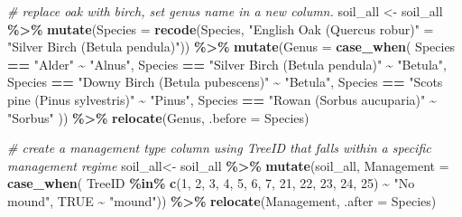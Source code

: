 \documentclass[
]{article}
\newenvironment{Shaded}{\begin{snugshade}}{\end{snugshade}}
\newcommand{\AttributeTok}[1]{\textcolor[rgb]{0.13,0.29,0.53}{#1}}
\newcommand{\CommentTok}[1]{\textcolor[rgb]{0.56,0.35,0.01}{\textit{#1}}}
\newcommand{\ConstantTok}[1]{\textcolor[rgb]{0.56,0.35,0.01}{#1}}
\newcommand{\DecValTok}[1]{\textcolor[rgb]{0.00,0.00,0.81}{#1}}
\newcommand{\FunctionTok}[1]{\textcolor[rgb]{0.13,0.29,0.53}{\textbf{#1}}}
\newcommand{\NormalTok}[1]{#1}
\newcommand{\OtherTok}[1]{\textcolor[rgb]{0.56,0.35,0.01}{#1}}
\newcommand{\SpecialCharTok}[1]{\textcolor[rgb]{0.81,0.36,0.00}{\textbf{#1}}}
\newcommand{\StringTok}[1]{\textcolor[rgb]{0.31,0.60,0.02}{#1}}
\begin{document}
\begin{Shaded}
\begin{Highlighting}[]
\CommentTok{\# replace oak with birch, set genus name in a new column. }
\NormalTok{soil\_all }\OtherTok{\textless{}{-}}\NormalTok{ soil\_all }\SpecialCharTok{\%\textgreater{}\%} 
  \FunctionTok{mutate}\NormalTok{(}\AttributeTok{Species =} \FunctionTok{recode}\NormalTok{(Species,}
                          \StringTok{"English Oak (Quercus robur)"} \OtherTok{=} \StringTok{"Silver Birch (Betula pendula)"}\NormalTok{)) }\SpecialCharTok{\%\textgreater{}\%}
  \FunctionTok{mutate}\NormalTok{(}\AttributeTok{Genus =} \FunctionTok{case\_when}\NormalTok{(}
\NormalTok{    Species }\SpecialCharTok{==} \StringTok{"Alder"} \SpecialCharTok{\textasciitilde{}} \StringTok{"Alnus"}\NormalTok{, }
\NormalTok{    Species }\SpecialCharTok{==} \StringTok{"Silver Birch (Betula pendula)"} \SpecialCharTok{\textasciitilde{}} \StringTok{"Betula"}\NormalTok{, }
\NormalTok{    Species }\SpecialCharTok{==} \StringTok{"Downy Birch (Betula pubescens)"} \SpecialCharTok{\textasciitilde{}} \StringTok{"Betula"}\NormalTok{,}
\NormalTok{    Species }\SpecialCharTok{==} \StringTok{"Scots pine (Pinus sylvestris)"} \SpecialCharTok{\textasciitilde{}} \StringTok{"Pinus"}\NormalTok{,}
\NormalTok{    Species }\SpecialCharTok{==} \StringTok{"Rowan (Sorbus aucuparia)"} \SpecialCharTok{\textasciitilde{}} \StringTok{"Sorbus"}
\NormalTok{  ))  }\SpecialCharTok{\%\textgreater{}\%}
  \FunctionTok{relocate}\NormalTok{(Genus, }\AttributeTok{.before =}\NormalTok{ Species)}

\CommentTok{\# create a management type column using TreeID that falls within a specific management regime}
\NormalTok{soil\_all}\OtherTok{\textless{}{-}}\NormalTok{ soil\_all }\SpecialCharTok{\%\textgreater{}\%} 
  \FunctionTok{mutate}\NormalTok{(soil\_all, }\AttributeTok{Management =} \FunctionTok{case\_when}\NormalTok{(}
\NormalTok{    TreeID }\SpecialCharTok{\%in\%} \FunctionTok{c}\NormalTok{(}\DecValTok{1}\NormalTok{, }\DecValTok{2}\NormalTok{, }\DecValTok{3}\NormalTok{, }\DecValTok{4}\NormalTok{, }\DecValTok{5}\NormalTok{, }\DecValTok{6}\NormalTok{, }\DecValTok{7}\NormalTok{, }\DecValTok{21}\NormalTok{, }\DecValTok{22}\NormalTok{, }\DecValTok{23}\NormalTok{, }\DecValTok{24}\NormalTok{, }\DecValTok{25}\NormalTok{) }\SpecialCharTok{\textasciitilde{}} \StringTok{"No mound"}\NormalTok{, }
    \ConstantTok{TRUE} \SpecialCharTok{\textasciitilde{}} \StringTok{"mound"}\NormalTok{)) }\SpecialCharTok{\%\textgreater{}\%}
  \FunctionTok{relocate}\NormalTok{(Management, }\AttributeTok{.after =}\NormalTok{ Species)}


\end{Highlighting}
\end{Shaded}
\end{document}
